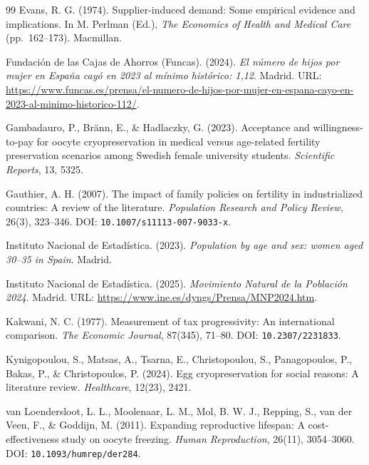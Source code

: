 \documentclass[12pt,a4paper]{article}
\begin{document}
\begin{thebibliography}{99}
Evans, R. G. (1974). Supplier-induced demand: Some empirical evidence
and implications. In M. Perlman (Ed.), \emph{The Economics of Health
and Medical Care} (pp.\ 162--173). Macmillan.

Fundaci\'on de las Cajas de Ahorros (Funcas). (2024). \emph{El
n\'umero de hijos por mujer en Espa\~na cay\'o en 2023 al m\'inimo
hist\'orico: 1,12}. Madrid. URL:
\url{https://www.funcas.es/prensa/el-numero-de-hijos-por-mujer-en-espana-cayo-en-2023-al-minimo-historico-112/}.

Gambadauro, P., Br\"ann, E., \& Hadlaczky, G. (2023). Acceptance and
willingness-to-pay for oocyte cryopreservation in medical versus
age-related fertility preservation scenarios among Swedish female
university students. \emph{Scientific Reports}, 13, 5325.

Gauthier, A. H. (2007). The impact of family policies on fertility in
industrialized countries: A review of the literature. \emph{Population
Research and Policy Review}, 26(3), 323--346. DOI:
\nolinkurl{10.1007/s11113-007-9033-x}.

Instituto Nacional de Estad\'istica. (2023). \emph{Population by age
and sex: women aged 30--35 in Spain}. Madrid.

Instituto Nacional de Estad\'istica. (2025). \emph{Movimiento Natural
de la Poblaci\'on 2024}. Madrid. URL:
\url{https://www.ine.es/dyngs/Prensa/MNP2024.htm}.

Kakwani, N. C. (1977). Measurement of tax progressivity: An
international comparison. \emph{The Economic Journal}, 87(345), 71--80.
DOI: \nolinkurl{10.2307/2231833}.

Kynigopoulou, S., Matsas, A., Tsarna, E., Christopoulou, S.,
Panagopoulos, P., Bakas, P., \& Christopoulos, P. (2024). Egg
cryopreservation for social reasons: A literature review.
\emph{Healthcare}, 12(23), 2421.

van Loendersloot, L. L., Moolenaar, L. M., Mol, B. W. J., Repping, S.,
van der Veen, F., \& Goddijn, M. (2011). Expanding reproductive
lifespan: A cost-effectiveness study on oocyte freezing. \emph{Human
Reproduction}, 26(11), 3054--3060. DOI:
\nolinkurl{10.1093/humrep/der284}.


\end{thebibliography}
\end{document}
